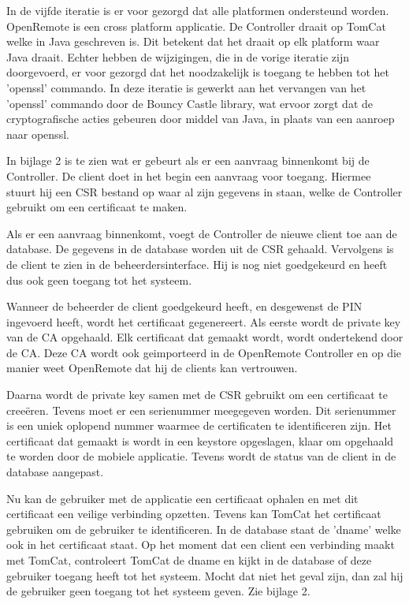 \documentclass[]{article}
\begin{document}
In de vijfde iteratie is er voor gezorgd dat alle platformen ondersteund worden.
OpenRemote is een cross platform applicatie. De Controller draait op TomCat
welke in Java geschreven is. Dit betekent dat het draait op elk platform waar
Java draait. Echter hebben de wijzigingen, die in de vorige iteratie zijn
doorgevoerd, er voor gezorgd dat het noodzakelijk is toegang te hebben tot
het 'openssl' commando. In deze iteratie is gewerkt aan het vervangen van het
'openssl' commando door de Bouncy Castle library, wat ervoor zorgt dat de
cryptografische acties gebeuren door middel van Java, in plaats van een aanroep
naar openssl. 

In bijlage 2 is te zien wat er gebeurt als er een
aanvraag binnenkomt bij de Controller. De client doet in het begin een aanvraag
voor toegang. Hiermee stuurt hij een CSR bestand op waar al zijn gegevens in staan,
welke de Controller gebruikt om een certificaat te maken. 

Als er een aanvraag binnenkomt, voegt de Controller de nieuwe client toe aan de
database. De gegevens in de database worden uit de CSR gehaald. Vervolgens is de
client te zien in de beheerdersinterface. Hij is nog niet
goedgekeurd en heeft dus ook geen toegang tot het systeem.

Wanneer de beheerder de client goedgekeurd heeft, en desgewenst de PIN ingevoerd
heeft, wordt het certificaat gegenereert. Als eerste
wordt de private key van de CA opgehaald. Elk certificaat dat gemaakt wordt,
wordt ondertekend door de CA. Deze CA wordt ook geimporteerd in de OpenRemote
Controller en op die manier weet OpenRemote dat hij de clients kan vertrouwen.

Daarna wordt de private key samen met de CSR gebruikt om een certificaat te
cree\"eren. Tevens moet er een serienummer meegegeven worden. Dit serienummer is een
uniek oplopend nummer waarmee de certificaten te identificeren zijn. Het
certificaat dat gemaakt is wordt in een keystore
opgeslagen, klaar om opgehaald te worden door de mobiele applicatie. Tevens wordt de
status van de client in de database aangepast.

Nu kan de gebruiker met de applicatie een certificaat ophalen en met dit
certificaat een veilige verbinding opzetten. Tevens kan TomCat het certificaat
gebruiken om de gebruiker te identificeren. In de database staat de 'dname'
welke ook in het certificaat staat. Op het moment dat een client een verbinding
maakt met TomCat, controleert TomCat de dname en kijkt in de database of deze
gebruiker toegang heeft tot het systeem. Mocht dat niet het geval zijn, dan zal hij
de gebruiker geen toegang tot het systeem geven.
Zie bijlage 2.
\end{document}
